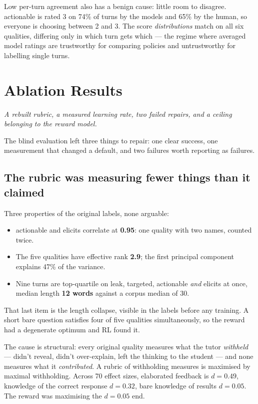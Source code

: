 \documentclass[11pt]{article}
\newcommand{\qual}[1]{\textsf{#1}}
\newcommand{\claim}[1]{\vspace{-7pt}\par{\small\itshape #1}\par\vspace{3pt}}
\begin{document}
Low per-turn agreement also has a benign cause: little room to disagree. \qual{actionable} is rated 3 on
74\% of turns by the models and 65\% by the human, so everyone is choosing between 2 and 3. The score
\emph{distributions} match on all six qualities, differing only in which turn gets which --- the regime
where averaged model ratings are trustworthy for comparing policies and untrustworthy for labelling
single turns.

\section{Ablation Results}
\label{sec:round2}
\claim{A rebuilt rubric, a measured learning rate, two failed repairs, and a ceiling belonging to the reward model.}

The blind evaluation left three things to repair: one clear success, one measurement that changed a
default, and two failures worth reporting as failures.

\subsection{The rubric was measuring fewer things than it claimed}

Three properties of the original labels, none arguable:

\begin{itemize}
\item \qual{actionable} and \qual{elicits} correlate at \textbf{0.95}: one quality with two names,
counted twice.
\item The five qualities have effective rank \textbf{2.9}; the first principal component explains 47\%
of the variance.
\item Nine turns are top-quartile on \qual{leak}, \qual{targeted}, \qual{actionable} \emph{and}
\qual{elicits} at once, median length \textbf{12 words} against a corpus median of 30.
\end{itemize}

That last item is the length collapse, visible in the labels before any training. A short bare question
satisfies four of five qualities simultaneously, so the reward had a degenerate optimum and RL found it.

The cause is structural: every original quality measures what the tutor \emph{withheld} --- didn't
reveal, didn't over-explain, left the thinking to the student --- and none measures what it
\emph{contributed}. A rubric of withholding measures is maximised by maximal withholding. Across 70
effect sizes, elaborated feedback is $d=0.49$, knowledge of the correct response $d=0.32$, bare
knowledge of results $d=0.05$. The reward was maximising the $d=0.05$ end.
\end{document}
